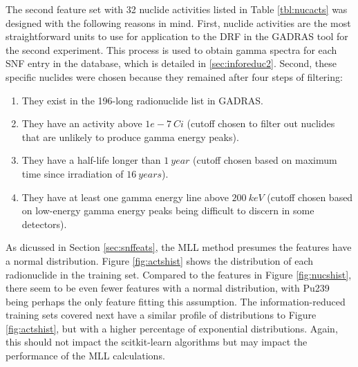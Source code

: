 The second feature set with 32 nuclide activities listed in Table
\ref{tbl:nucacts} was designed with the following reasons in mind. First,
nuclide activities are the most straightforward units to use for application to
the \gls{DRF} in the \gls{GADRAS} tool for the second experiment. This process
is used to obtain gamma spectra for each \gls{SNF} entry in the database, which
is detailed in \ref{sec:inforeduc2}.  Second, these specific nuclides were
chosen because they remained after four steps of filtering:
\begin{enumerate}
  \item They exist in the 196-long radionuclide list in \gls{GADRAS}.
  \item They have an activity above $1e-7\:Ci$ (cutoff chosen to filter out
  nuclides that are unlikely to produce gamma energy peaks).
  \item They have a half-life longer than $1\:year$ (cutoff chosen based on
  maximum time since irradiation of $16\:years$).
  \item They have at least one gamma energy line above $200\:keV$ (cutoff
  chosen based on low-energy gamma energy peaks being difficult to discern in
  some detectors).
\end{enumerate}

As dicussed in Section \ref{sec:snffeats}, the \gls{MLL} method presumes the
features have a normal distribution. Figure \ref{fig:actshist} shows the
distribution of each radionuclide in the training set. Compared to the features
in Figure \ref{fig:nucshist}, there seem to be even fewer features with a
normal distribution, with Pu239 being perhaps the only feature fitting this
assumption. The information-reduced training sets covered next have a similar
profile of distributions to Figure \ref{fig:actshist}, but with a higher
percentage of exponential distributions.  Again, this should not impact the
scitkit-learn algorithms but may impact the performance of the \gls{MLL}
calculations.  

